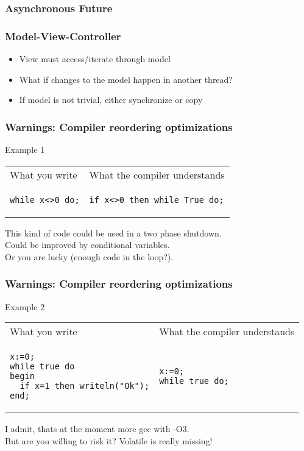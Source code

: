 \documentclass{beamer}
\begin{document}
\begin{frame}
\frametitle{Asynchronous Future}
\end{frame}

\begin{frame}
\frametitle{Model-View-Controller}
\begin{itemize}
 \item View must access/iterate through model
 \item What if changes to the model happen in another thread?
 \item If model is not trivial, either synchronize or copy
\end{itemize}
\end{frame}

\begin{frame}[fragile]
\frametitle{Warnings: Compiler reordering optimizations}

\begin{center}
Example 1
\end{center}
\begin{tabular}{p{5.7cm} p{5.7cm}}
What you write
&
What the compiler understands\\
\begin{verbatim}
while x<>0 do;
\end{verbatim}
&
\begin{verbatim}
if x<>0 then while True do;
\end{verbatim}
\end{tabular}
\begin{center}
This kind of code could be used in a two phase shutdown.\\
Could be improved by conditional variables.\\
Or you are lucky (enough code in the loop?).\\
\end{center}
\end{frame}

\begin{frame}[fragile]
\frametitle{Warnings: Compiler reordering optimizations}

\begin{center}
Example 2
\end{center}
\begin{tabular}{p{5.7cm} p{5.7cm}}
What you write
&
What the compiler understands\\
\begin{verbatim}
x:=0;
while true do
begin
  if x=1 then writeln("Ok");
end;
\end{verbatim}
&
\begin{verbatim}
x:=0;
while true do;
\end{verbatim}
\end{tabular}

\begin{center}
I admit, thats at the moment more gcc with -O3.\\
But are you willing to risk it? Volatile is really missing!
\end{center}
\end{frame}
\end{document}
